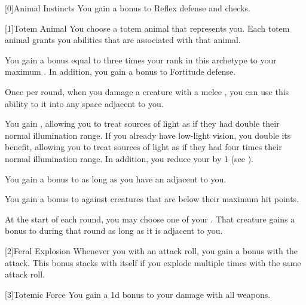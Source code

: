         [0]{Animal Instincts} You gain a  bonus to Reflex defense and  checks.

        [1]{Totem Animal} You choose a totem animal that represents you.
        Each totem animal grants you abilities that are associated with that animal.
        {
             You gain a bonus equal to three times your rank in this archetype to your maximum .
            In addition, you gain a  bonus to Fortitude defense.

             Once per round, when you damage a creature with a melee , you can use this ability to  it into any space adjacent to you.

             You gain , allowing you to treat sources of light as if they had double their normal illumination range.
            If you already have low-light vision, you double its benefit, allowing you to treat sources of light as if they had four times their normal illumination range.
            In addition, you reduce your  by 1 (see ).

             You gain a  bonus to  as long as you have an  adjacent to you.

             You gain a  bonus to  against creatures that are below their maximum hit points.

             At the start of each round, you may choose one of your .
            That creature gains a  bonus to  during that round as long as it is adjacent to you.
        }

        [2]{Feral Explosion} Whenever you  with an attack roll, you gain a   bonus with the attack.
        This bonus stacks with itself if you explode multiple times with the same attack roll.

        [3]{Totemic Force} You gain a \plus1d bonus to your damage with all weapons.

